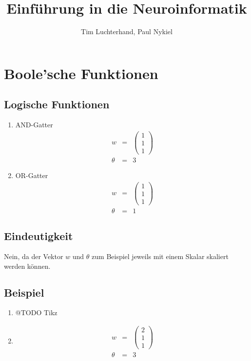 \documentclass[DIN, pagenumber=false, fontsize=11pt, parskip=half]{scrartcl}
\title{Einführung in die Neuroinformatik}
\author{Tim Luchterhand, Paul Nykiel}
\begin{document}
    \maketitle
    \section{Boole'sche Funktionen}
    \subsection{Logische Funktionen}
    \begin{enumerate}[label = (\alph*)]
        \item AND-Gatter
            \begin{eqnarray*}
                w &=& \begin{pmatrix}
                    1 \\ 1 \\ 1
                \end{pmatrix} \\
                \theta &=& 3
            \end{eqnarray*}
        \item OR-Gatter
            \begin{eqnarray*}
                w &=& \begin{pmatrix}
                    1 \\ 1 \\ 1
                \end{pmatrix} \\
                \theta &=& 1
            \end{eqnarray*}
    \end{enumerate}
    \subsection{Eindeutigkeit}
    Nein, da der Vektor $w$ und $\theta$ zum Beispiel jeweils mit einem Skalar skaliert werden können.
    \subsection{Beispiel}
    \begin{enumerate}[label=(\alph*)]
        \item @TODO Tikz
        \item 
            \begin{eqnarray*}
                w &=& \begin{pmatrix}
                    2 \\ 1 \\ 1
                \end{pmatrix} \\
                \theta &=& 3
            \end{eqnarray*}
    \end{enumerate}
\end{document}
